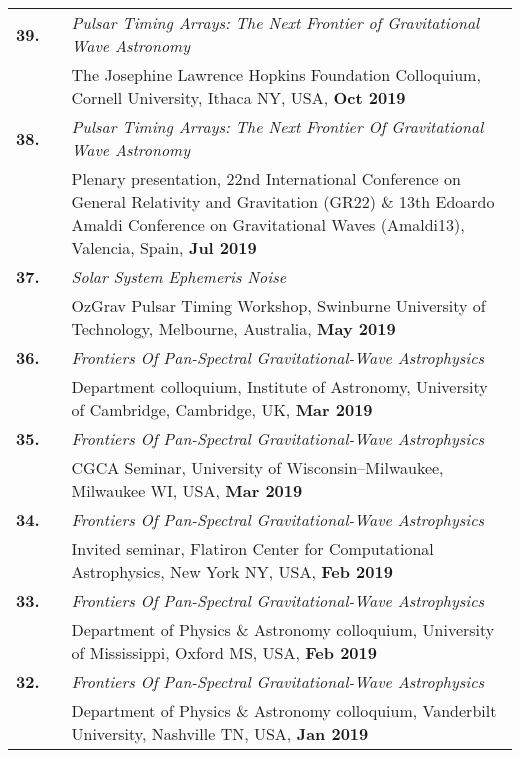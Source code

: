 \documentclass[11pt,letterpaper,sans]{moderncv}
\begin{document}
{\begin{longtable}{rp{0.3cm}p{15.8cm}}
\textbf{39.} & & \textit{Pulsar Timing Arrays: The Next Frontier of Gravitational Wave Astronomy} \\
&& The Josephine Lawrence Hopkins Foundation Colloquium, Cornell University, Ithaca NY, USA, \textbf{Oct 2019} \vspace{0.09cm}\\
\textbf{38.} & & \textit{Pulsar Timing Arrays: The Next Frontier Of Gravitational Wave Astronomy} \\
&& Plenary presentation, 22nd International Conference on General Relativity and Gravitation (GR22) \& 13th Edoardo Amaldi Conference on Gravitational Waves (Amaldi13), Valencia, Spain, \textbf{Jul 2019} \vspace{0.09cm}\\
\textbf{37.} & & \textit{Solar System Ephemeris Noise} \\
&& OzGrav Pulsar Timing Workshop, Swinburne University of Technology, Melbourne, Australia, \textbf{May 2019} \vspace{0.09cm}\\
\textbf{36.} & & \textit{Frontiers Of Pan-Spectral Gravitational-Wave Astrophysics} \\
&& Department colloquium, Institute of Astronomy, University of Cambridge, Cambridge, UK, \textbf{Mar 2019} \vspace{0.09cm}\\
\textbf{35.} & & \textit{Frontiers Of Pan-Spectral Gravitational-Wave Astrophysics} \\
&& CGCA Seminar, University of Wisconsin--Milwaukee, Milwaukee WI, USA, \textbf{Mar 2019} \vspace{0.09cm}\\
\textbf{34.} & & \textit{Frontiers Of Pan-Spectral Gravitational-Wave Astrophysics} \\
&& Invited seminar, Flatiron Center for Computational Astrophysics, New York NY, USA, \textbf{Feb 2019} \vspace{0.09cm}\\
\textbf{33.} & & \textit{Frontiers Of Pan-Spectral Gravitational-Wave Astrophysics} \\
&& Department of Physics \& Astronomy colloquium, University of Mississippi, Oxford MS, USA, \textbf{Feb 2019} \vspace{0.09cm}\\
\textbf{32.} & & \textit{Frontiers Of Pan-Spectral Gravitational-Wave Astrophysics} \\
&& Department of Physics \& Astronomy colloquium, Vanderbilt University, Nashville TN, USA, \textbf{Jan 2019} \vspace{0.09cm}\\

\end{longtable}}
\end{document}
